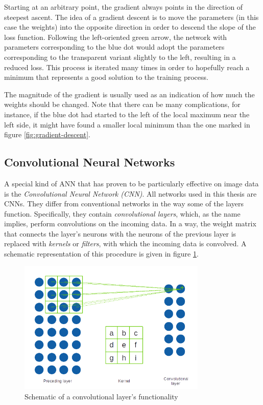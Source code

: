 \documentclass[11pt, a4paper]{article}
\begin{document}
Starting at an arbitrary point, the gradient always points in the direction of steepest ascent. The idea of a gradient descent is to move the parameters (in this case the weights) into the opposite direction in order to descend the slope of the loss function. Following the left-oriented green arrow, the network with parameters corresponding to the blue dot would adopt the parameters corresponding to the transparent variant slightly to the left, resulting in a reduced loss. This process is iterated many times in order to hopefully reach a minimum that represents a good solution to the training process.

The magnitude of the gradient is usually used as an indication of how much the weights should be changed. Note that there can be many complications, for instance, if the blue dot had started to the left of the local maximum near the left side, it might have found a smaller local minimum than the one marked in figure \ref{fig:gradient-descent}.










\subsection{Convolutional Neural Networks}
A special kind of ANN that has proven to be particularly effective on image data is the \emph{Convolutional Neural Network (CNN)}. All networks used in this thesis are CNNs. They differ from conventional networks in the way some of the layers function. Specifically, they contain \emph{convolutional layers}, which, as the name implies, perform convolutions on the incoming data. In a way, the weight matrix that connects the layer's neurons with the neurons of the previous layer is replaced with \emph{kernels} or \emph{filters}, with which the incoming data is convolved. A schematic representation of this procedure is given in figure \ref{fig:convolutional-layer}.

\begin{figure}[h!tb]
	\centering
	\includegraphics[width=0.8\textwidth]{images/convolution_layer.png}
	\caption[Functionality of convolutional layers]{Schematic of a convolutional layer's functionality}
	\label{fig:convolutional-layer}
\end{figure}
\end{document}
